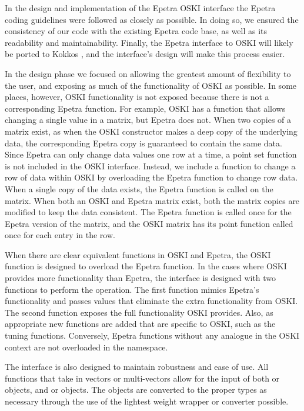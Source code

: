In the design and implementation of the Epetra OSKI interface
the Epetra coding guidelines \cite{IK:Epetra-coding}
were followed as closely as possible.  In doing so, we ensured the consistency of
our code with the existing Epetra code base, as well as its readability and maintainability.
Finally, the Epetra interface to OSKI
will likely be ported to Kokkos \cite{IK:Kokkos-site}, and the interface's design will make
this process easier.

In the design phase we focused on allowing the greatest amount of flexibility to the user,
and exposing as much of the functionality of OSKI as possible.  In some places, however, OSKI
functionality is not exposed because there is not a corresponding Epetra function.
For example, OSKI has a function that allows changing a
single value in a matrix, but Epetra does not.  When two copies of a matrix exist, as when the
OSKI constructor makes a deep copy of the underlying data, the corresponding Epetra copy is
guaranteed to contain the same data.  Since Epetra can only change data values one row at a time,
a point set function is not included in the OSKI interface.  Instead, we include a function
to change a row of data within OSKI by overloading the Epetra function to change row data.  When a
single copy of the data exists, the Epetra function is called on the matrix.
When both an OSKI and Epetra matrix exist, both the matrix copies are modified to keep the data
consistent.  The Epetra function is called once for the Epetra version of the matrix,
and the OSKI matrix has its point function called once for each entry in the row.

When there are clear equivalent functions in OSKI and Epetra, the OSKI function is designed to
overload the Epetra function.  In the cases where OSKI provides more functionality than Epetra, the interface is designed with
two functions to perform the operation.  The first function mimics Epetra's functionality and passes
values that eliminate the extra functionality from OSKI.  The second function exposes the
full functionality OSKI provides.  Also, as appropriate new functions are added that are
specific to OSKI, such as the tuning functions.  Conversely, Epetra functions without any analogue in the OSKI
context are not overloaded in the  namespace.

The interface is also designed to maintain robustness and ease of use.  All \newline {}
functions that take in vectors or multi-vectors allow for the input of both  or
 objects, and  or 
objects.  The objects are converted to the proper types as necessary through the
use of the lightest weight wrapper or converter possible.

